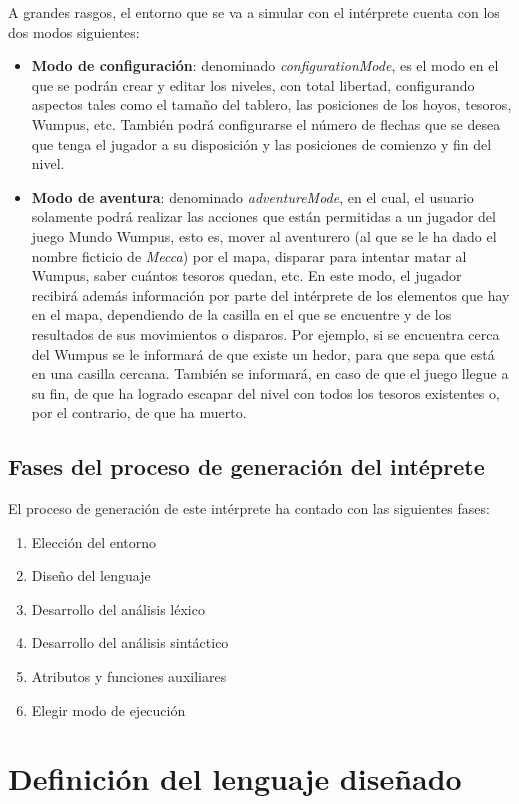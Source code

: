 \documentclass[a4paper,12pt,twoside,openright]{report}
\begin{document}
  A grandes rasgos, el entorno que se va a simular con el intérprete cuenta con los dos modos siguientes:
  \begin{itemize}
  \item \textbf{Modo de configuración}: denominado \emph{configurationMode}, es el modo en el que se podrán crear y editar los 
  niveles, con total libertad, configurando aspectos tales como el tamaño del tablero, las posiciones de los hoyos, tesoros, 
  Wumpus, etc. También podrá configurarse el número de flechas que se desea que tenga el jugador a su disposición y las 
  posiciones de comienzo y fin del nivel.
  \item \textbf{Modo de aventura}: denominado \emph{adventureMode}, en el cual, el usuario solamente podrá realizar las 
  acciones que están permitidas a un jugador del juego Mundo Wumpus, esto es, mover al 
  aventurero (al que se le ha dado el nombre ficticio de \emph{Mecca}) por el mapa, 
  disparar para intentar matar al Wumpus, saber cuántos tesoros quedan, etc. En este 
  modo, el jugador recibirá además información por parte del intérprete de los elementos 
  que hay en el mapa, dependiendo de la casilla en el que se encuentre y de los 
  resultados de sus movimientos o disparos. Por ejemplo, si se encuentra cerca del Wumpus 
  se le informará de que existe un hedor, para que sepa que está en una casilla cercana. 
  También se informará, en caso de que el juego llegue a su fin, de que ha logrado escapar 
  del nivel con todos los tesoros existentes o, por el contrario, de que ha muerto.
  \end{itemize}

\section{Fases del proceso de generación del intéprete}
  El proceso de generación de este intérprete ha contado con las siguientes fases:
  \begin{enumerate}
   \item Elección del entorno
   \item Diseño del lenguaje
   \item Desarrollo del análisis léxico
   \item Desarrollo del análisis sintáctico
   \item Atributos y funciones auxiliares
   \item Elegir modo de ejecución
  \end{enumerate}

\chapter{Definición del lenguaje diseñado \label{defleng}}
\end{document}

